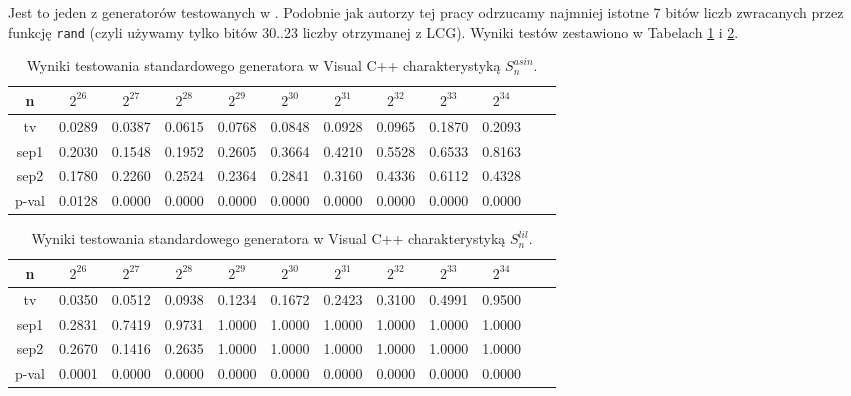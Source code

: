 \documentclass[a4paper,11pt,twoside]{book}
\newcommand{\Slil}[1]{S^{lil}_#1}
\newcommand{\Sasin}[1]{S^{asin}_#1}
\theoremstyle{definition}
\begin{document}
Jest to jeden z generatorów testowanych w \cite{wang-nic}. Podobnie jak autorzy tej pracy odrzucamy najmniej istotne 7 bitów liczb zwracanych przez funkcję \texttt{rand} (czyli używamy tylko bitów 30..23 liczby otrzymanej z LCG). Wyniki testów zestawiono w Tabelach \ref{tab:svis_asin} i \ref{tab:svis_lil}.

\begin{table}[ht!]
\centering
 \caption{Wyniki testowania standardowego generatora w Visual C++ charakterystyką $\Sasin{n}$.}
 \label{tab:svis_asin}
\begin{tabular} {||c|c|c|c|c|c|c|c|c|c|c|c||}  
 \hline
     n &  $2^{26}$ &  $2^{27}$ &  $2^{28}$ &  $2^{29}$ &  $2^{30}$ &  $2^{31}$ &  $2^{32}$ &  $2^{33}$ &  $2^{34}$\\ \hline
     tv &  0.0289 &  0.0387 &  0.0615 &  0.0768 &  0.0848 &  0.0928 &  0.0965 &  0.1870 &  0.2093\\ \hline
   sep1 &  0.2030 &  0.1548 &  0.1952 &  0.2605 &  0.3664 &  0.4210 &  0.5528 &  0.6533 &  0.8163\\ \hline
   sep2 &  0.1780 &  0.2260 &  0.2524 &  0.2364 &  0.2841 &  0.3160 &  0.4336 &  0.6112 &  0.4328\\ \hline
  p-val &  0.0128 &  0.0000 &  0.0000 &  0.0000 &  0.0000 &  0.0000 &  0.0000 &  0.0000 &  0.0000\\ \hline 
\end{tabular}  
\end{table}

\begin{table}[ht!]
\centering
 \caption{Wyniki testowania standardowego generatora w Visual C++ charakterystyką $\Slil{n}$.}
 \label{tab:svis_lil}
\begin{tabular} {||c|c|c|c|c|c|c|c|c|c|c|c||}  
 \hline 
     n &  $2^{26}$ &  $2^{27}$ &  $2^{28}$ &  $2^{29}$ &  $2^{30}$ &  $2^{31}$ &  $2^{32}$ &  $2^{33}$ &  $2^{34}$\\ \hline
     tv &  0.0350 &  0.0512 &  0.0938 &  0.1234 &  0.1672 &  0.2423 &  0.3100 &  0.4991 &  0.9500\\ \hline
   sep1 &  0.2831 &  0.7419 &  0.9731 &  1.0000 &  1.0000 &  1.0000 &  1.0000 &  1.0000 &  1.0000\\ \hline
   sep2 &  0.2670 &  0.1416 &  0.2635 &  1.0000 &  1.0000 &  1.0000 &  1.0000 &  1.0000 &  1.0000\\ \hline
  p-val &  0.0001 &  0.0000 &  0.0000 &  0.0000 &  0.0000 &  0.0000 &  0.0000 &  0.0000 &  0.0000\\ \hline
\end{tabular}  
\end{table}
\end{document}
